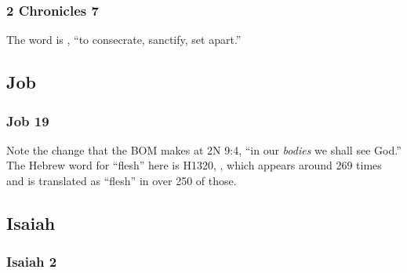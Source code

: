 	\subsubsection{2 Chronicles 7} %
	
		\begin{compactdesc}
		
		\item[7$\vert$]
		\begin{compactdesc}
		\item[hallowed] The word is , ``to consecrate, sanctify, set apart.''
		\end{compactdesc}
		
		\end{compactdesc}
		
\subsection{Job} %

	\subsubsection{Job 19} %
	
		\begin{compactdesc}
		
		\item[26$\vert$]
		\begin{compactdesc}
		\item[in my flesh shall I see God] Note the change that the BOM makes at 2N 9:4, ``in our \textit{bodies} we shall see God.''
			The Hebrew word for ``flesh'' here is H1320, , which appears around 269 times and is translated as ``flesh'' in over 250 of those.
		\end{compactdesc}
		
		\end{compactdesc}
		
\subsection{Isaiah} %

	\subsubsection{Isaiah 2} %
	
